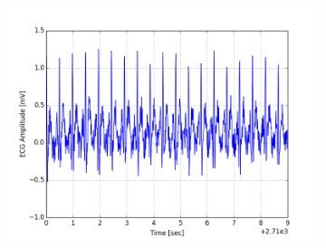 \documentclass[paper=a4, fontsize=11pt]{scrartcl}
\numberwithin{equation}{section}		%
\numberwithin{figure}{section}			%
\numberwithin{table}{section}		    %
\begin{document}
\begin{appendices}
\begin{figure}[H]
\begin{subfigure}[b]{0.3\textwidth}
		\includegraphics[width=\textwidth]{sim/ecg_42}
	\end{subfigure}
\end{figure}


\end{appendices}
\end{document}
